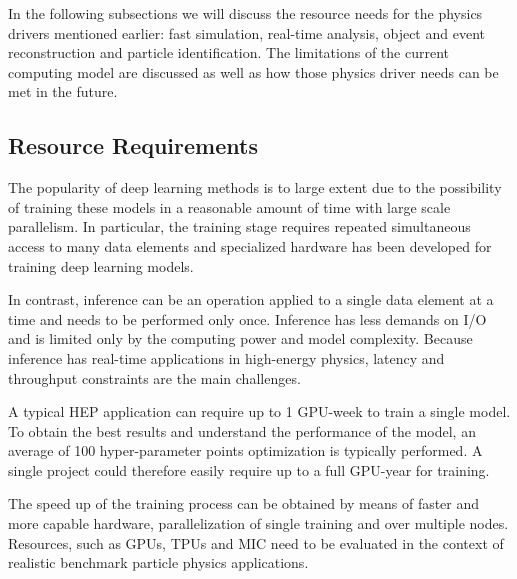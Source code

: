 In the following subsections we will discuss the resource needs for the physics drivers mentioned earlier: fast simulation, real-time analysis, object and event reconstruction and particle identification. The limitations of the current computing model are discussed as well as how those physics driver needs can be met in the future.



\subsection{Resource Requirements}

The popularity of deep learning methods is to large extent due to the possibility of training these models in a reasonable amount of time with large scale parallelism. In particular, the training stage requires repeated simultaneous access to many data elements and specialized hardware has been developed for training deep learning models. %

In contrast, inference can be an operation applied to a single data element at a time and needs to be performed only once. Inference has less demands on I/O and is limited only by the computing power and model complexity. Because inference has real-time applications in high-energy physics, latency and throughput constraints are the main challenges.


A typical HEP application can require up to 1 GPU-week to train a single model.
To obtain the best results and understand the performance of the model, an average of 100 hyper-parameter points optimization is typically performed. A single project could therefore easily require up to a full GPU-year for training.

The speed up of the training process can be obtained by means of faster and more capable hardware, parallelization of single training and over multiple nodes. Resources, such as GPUs, TPUs and MIC need to be evaluated in the context of realistic benchmark particle physics applications.


